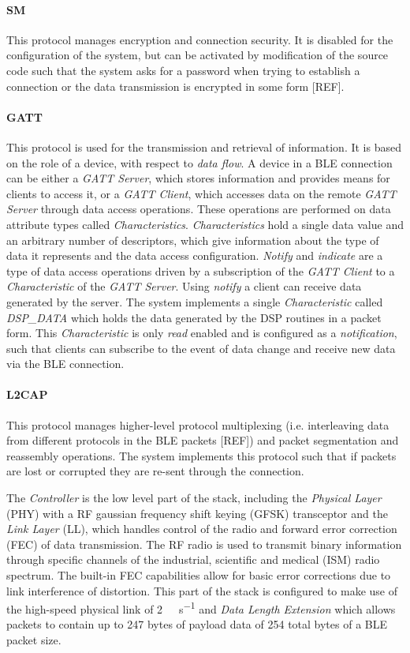 \paragraph{SM}
This protocol manages encryption and connection security. It is disabled for the configuration of the system, but can be activated by modification of the source code such that the system asks for a password when trying to establish a connection or the data transmission is encrypted in some form [REF].

\paragraph{GATT}
This protocol is used for the transmission and retrieval of information. It is based on the role of a device, with respect to \textit{data flow}. A device in a BLE connection can be either a \textit{GATT Server}, which stores information and provides means for clients to access it, or a \textit{GATT Client}, which accesses data on the remote \textit{GATT Server} through data access operations. These operations are performed on data attribute types called \textit{Characteristics}. \textit{Characteristics} hold a single data value and an arbitrary number of descriptors, which give information about the type of data it represents and the data access configuration. \textit{Notify} and \textit{indicate} are a type of data access operations driven by a subscription of the \textit{GATT Client} to a \textit{Characteristic} of the \textit{GATT Server}. Using \textit{notify} a client can receive data generated by the server. The system implements a single \textit{Characteristic} called \textit{DSP\_DATA} which holds the data generated by the DSP routines in a packet form. This \textit{Characteristic} is only \textit{read} enabled and is configured as a \textit{notification}, such that clients can subscribe to the event of data change and receive new data via the BLE connection.

\paragraph{L2CAP}
This protocol manages higher-level protocol multiplexing (i.e. interleaving data from different protocols in the BLE packets [REF]) and packet segmentation and reassembly operations. The system implements this protocol such that if packets are lost or corrupted they are re-sent through the connection.

The \textit{Controller} is the low level part of the stack, including the \textit{Physical Layer} (PHY) with a RF gaussian frequency shift keying (GFSK) transceptor and the \textit{Link Layer} (LL), which handles control of the radio and forward error correction (FEC) of data transmission. The RF radio is used to transmit binary information through specific channels of the industrial, scientific and medical (ISM) radio spectrum. The built-in FEC capabilities allow for basic error corrections due to link interference of distortion. This part of the stack is configured to make use of the high-speed physical link of \SI{2}{\mega\bit\per\second} and \textit{Data Length Extension} which allows packets to contain up to 247 bytes of payload data of 254 total bytes of a BLE packet size.

